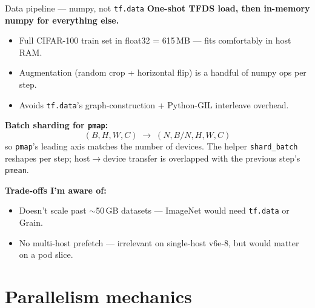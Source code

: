 \documentclass[aspectratio=169,10pt]{beamer}
\begin{document}
\begin{frame}{Data pipeline — numpy, not \texttt{tf.data}}
  \textbf{One-shot TFDS load, then in-memory numpy for everything else.}
  \begin{itemize}
    \item Full CIFAR-100 train set in float32 = 615\,MB — fits comfortably in host RAM.
    \item Augmentation (random crop + horizontal flip) is a handful of numpy ops per step.
    \item Avoids \texttt{tf.data}'s graph-construction + Python-GIL interleave overhead.
  \end{itemize}

  \vspace{0.4em}
  \textbf{Batch sharding for \texttt{pmap}:}
  \[
    (B, H, W, C) \;\longrightarrow\; (N, B/N, H, W, C)
  \]
  so \texttt{pmap}'s leading axis matches the number of devices. The helper
  \texttt{shard\_batch} reshapes per step; host$\to$device transfer is overlapped
  with the previous step's \texttt{pmean}.

  \vspace{0.4em}
  \textbf{Trade-offs I'm aware of:}
  \begin{itemize}
    \item Doesn't scale past $\sim$50\,GB datasets — ImageNet would need \texttt{tf.data}
          or Grain.
    \item No multi-host prefetch — irrelevant on single-host v6e-8, but would matter on a
          pod slice.
  \end{itemize}
\end{frame}

\section{Parallelism mechanics}
\end{document}
